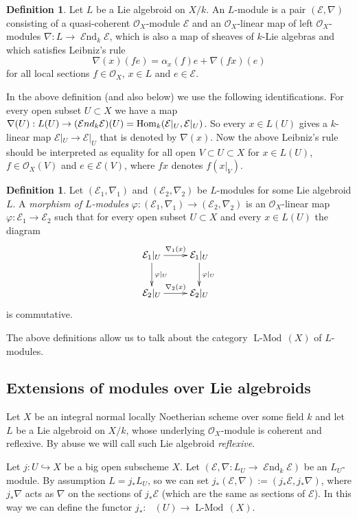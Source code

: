 \documentclass[12pt]{article}
\theoremstyle{plain}
\theoremstyle{definition}
\newtheorem{Definition}[Thm]{Definition}
\theoremstyle{remark}
\newcommand{\cE}{{\mathcal E}}
\newcommand{\cO}{{\mathcal O}}
\newcommand{\Mod}[1]{\mathop{\operatorname{{#1}-Mod}\, }}
\newcommand{\Hom}{{\mathop{{\rm Hom}}}}
\newcommand{\End}{{\mathop{{\mathcal E}nd}}}
\begin{document}
\begin{Definition}
Let $L$ be a Lie algebroid on $X/k$. An $L$-module is a pair $(\cE , \nabla)$ consisting of 
a quasi-coherent $\cO_X$-module $\cE$ and an $\cO_X$-linear map of left $\cO_X$-modules
	 $\nabla: L\to \End _{k}\cE$, which is also a map of sheaves of
	$k$-Lie algebras and which satisfies Leibniz's rule
	$$\nabla (x) (fe)=\alpha _x(f)e+\nabla(fx)(e)$$
	for all local sections $f\in \cO_X$, $x\in L$ and $e\in \cE$.
\end{Definition} 

In the above definition (and also below) we use the following identifications. For every open subset $U\subset X$  we have a map $\nabla (U): L(U)\to (\End _k \cE) (U)= \Hom _k (\cE |_U, \cE|_U)$. So every $x\in L (U)$ gives a $k$-linear map $\cE |_U\to \cE|_U$ that is denoted by $\nabla (x)$.
Now the above Leibniz's rule should be interpreted as equality for all open  $V\subset U\subset X$
for $x\in L(U)$, $f\in \cO_X(V)$ and $e\in \cE(V)$, where $fx$ denotes $f(x|_V)$.


\begin{Definition}
	Let $(\cE _1, \nabla _1)$ and $(\cE _2, \nabla _2)$ be $L$-modules for some Lie algebroid $L$.
	A \emph{morphism of $L$-modules} $\varphi : (\cE _1, \nabla _1)\to  (\cE _2, \nabla_2) $ is 
	an $\cO_X$-linear map $\varphi: \cE_1\to \cE_2$ such that for every open subset $U\subset X$ and
	 every $x\in L (U)$	  the diagram
	$$\xymatrix{\cE_1|_U\ar[r]^-{\nabla_1(x)}\ar[d]^{\varphi |_U}& \cE_1|_U\ar[d]^{\varphi |_U}\\
	 \cE_2|_U\ar[r]^-{\nabla_2 (x)}&\cE_2|_U\\
	}$$
	is commutative. 
\end{Definition}


The above definitions allow us to talk about the category $ \Mod{L} (X)$ of $L$-modules.

\subsection{Extensions of modules over Lie algebroids}\label{extensions-of-L-modules}

Let $X$ be an integral normal locally Noetherian scheme over some field $k$ and let $L$ be a Lie algebroid on $X/k$, whose underlying $\cO_X$-module is  coherent and reflexive. By abuse we will call such Lie algebroid \emph{reflexive}.

Let $j: U\hookrightarrow X $ be a big open subscheme $X$.  Let $(\cE, \nabla : L_U\to \End _{k} \cE)$ be an $L_U$-module. By assumption $L=j_*L_U$, so we can set $j_*(\cE, \nabla):=(j_*\cE, j_*\nabla)$, where $j_*\nabla$
acts as $\nabla$ on the sections of $j_*\cE$ (which are the same as sections of $\cE$). 
In this way we can define the functor $j_*:  \Mod{L_U} (U)\to  \Mod{L} (X)$. 
\end{document}
